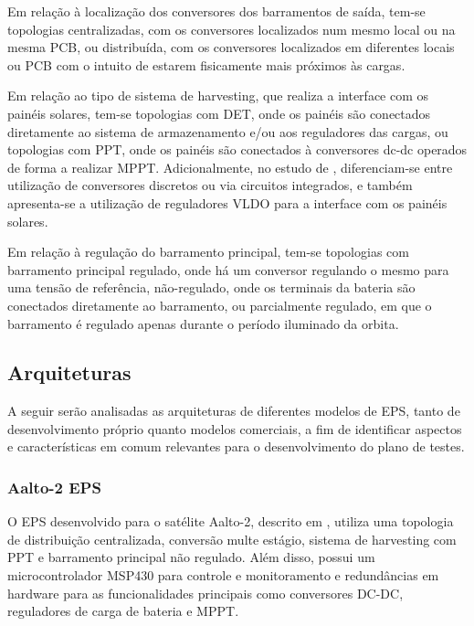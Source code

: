 Em relação à localização dos conversores dos barramentos de saída, tem-se topologias centralizadas, com os conversores localizados num mesmo local ou na mesma PCB, ou distribuída, com os conversores localizados em diferentes locais ou PCB com o intuito de estarem fisicamente mais próximos às cargas.

Em relação ao tipo de sistema de harvesting, que realiza a interface com os painéis solares, tem-se topologias com \gls{DET}, onde os painéis são conectados diretamente ao sistema de armazenamento e/ou aos reguladores das cargas, ou topologias com \gls{PPT}, onde os painéis são conectados à conversores dc-dc operados de forma a realizar \gls{MPPT}.
Adicionalmente, no estudo de \textcite{sara-review-eps}, diferenciam-se entre utilização de conversores discretos ou via circuitos integrados, e também apresenta-se a utilização de reguladores VLDO para a interface com os painéis solares.

Em relação à regulação do barramento principal, tem-se topologias com barramento principal regulado, onde há um conversor regulando o mesmo para uma tensão de referência, não-regulado, onde os terminais da bateria são conectados diretamente ao barramento, ou parcialmente regulado, em que o barramento é regulado apenas durante o período iluminado da orbita.



\subsection{Arquiteturas}\label{sec:arquiteturas}

A seguir serão analisadas as arquiteturas de diferentes modelos de \gls{EPS}, tanto de desenvolvimento próprio quanto modelos comerciais, a fim de identificar aspectos e características em comum relevantes para o desenvolvimento do plano de testes.

\subsubsection{Aalto-2 EPS}

O \gls{EPS} desenvolvido para o satélite Aalto-2, descrito em \textcite{aalto-eps}, utiliza uma topologia de distribuição centralizada, conversão multe estágio, sistema de harvesting com \gls{PPT} e barramento principal não regulado.
Além disso, possui um microcontrolador MSP430 para controle e monitoramento e redundâncias em hardware para as funcionalidades principais como conversores DC-DC, reguladores de carga de bateria e \gls{MPPT}.

